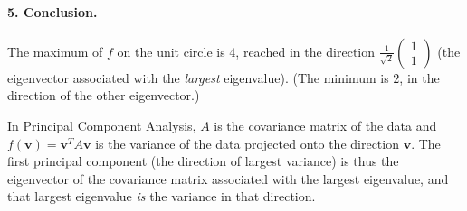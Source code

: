\documentclass[]{article}
\begin{document}
	\paragraph{5. Conclusion.}
	The maximum of $f$ on the unit circle is $4$, reached in the direction $\frac{1}{\sqrt{2}}\begin{pmatrix} 1 \\ 1 \end{pmatrix}$ (the eigenvector associated with the \textit{largest} eigenvalue).
	(The minimum is $2$, in the direction of the other eigenvector.)

	In Principal Component Analysis, $A$ is the covariance matrix of the data and $f(\mathbf{v}) = \mathbf{v}^T A \mathbf{v}$ is the variance of the data projected onto the direction $\mathbf{v}$.
	The first principal component (the direction of largest variance) is thus the eigenvector of the covariance matrix associated with the largest eigenvalue, and that largest eigenvalue \textit{is} the variance in that direction.
\end{document}
